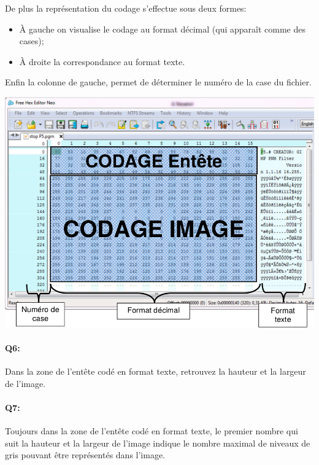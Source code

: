 \documentclass{article}
\begin{document}
De plus la représentation du codage s’effectue sous deux formes:
\begin{itemize}
	\item À gauche on visualise le codage au format décimal (qui apparaît comme des cases);
	\item À droite la correspondance au format texte.\\
\end{itemize}

Enfin la colonne de gauche, permet de déterminer le numéro de la case du fichier.\\

\begin{center}
	\includegraphics[width=.8\linewidth]{./figures/header_hex.png}
\end{center}

\paragraph{Q6:}
Dans la zone de l'entête codé en format texte, retrouvez la hauteur et la largeur de l'image.

\vspace{1em}
\begin{Form}
	\TextField[name=r6,width=\linewidth,height=5em,multiline=true]{}
\end{Form}

\newpage

\paragraph{Q7:}
Toujours dans la zone de l'entête codé en format texte, 
le premier nombre qui suit la hauteur et la largeur de l'image indique le nombre maximal de niveaux de gris pouvant être représentés dans l'image.\\
\end{document}
